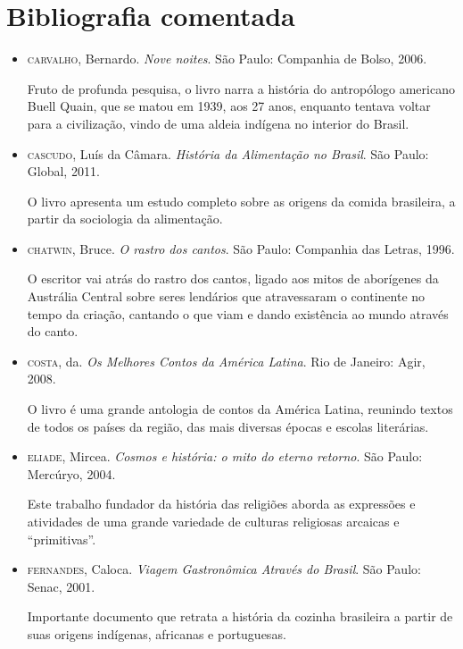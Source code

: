 \documentclass[11pt]{extarticle}
\begin{document}
\section{Bibliografia comentada}

\begin{itemize}

\item \textsc{carvalho}, Bernardo. \textit{Nove noites}. São Paulo: Companhia de Bolso, 2006.

Fruto de profunda pesquisa, o livro narra a história do antropólogo americano Buell Quain, que se matou em 1939, aos 27 anos, enquanto tentava voltar para a civilização, vindo de uma aldeia indígena no interior do Brasil.

\item \textsc{cascudo}, Luís da Câmara. \textit{História da Alimentação no Brasil}. São Paulo: Global, 2011.

O livro apresenta um estudo completo sobre as origens da comida brasileira, a partir da sociologia da alimentação.

\item \textsc{chatwin}, Bruce. \textit{O rastro dos cantos}. São Paulo: Companhia das Letras, 1996.

O escritor vai atrás do rastro dos cantos, ligado aos mitos de aborígenes da Austrália Central sobre seres lendários que atravessaram o continente no tempo da criação, cantando o que viam e dando existência ao mundo através do canto.

\item \textsc{costa}, da. \textit{Os Melhores Contos da América Latina}. Rio de Janeiro: Agir, 2008.

O livro é uma grande antologia de contos da América Latina, reunindo textos de todos os países da região, das mais diversas épocas e escolas literárias.

\item \textsc{eliade}, Mircea. \textit{Cosmos e história: o mito do eterno retorno}. São Paulo: Mercúryo, 2004.

Este trabalho fundador da história das religiões aborda as expressões e atividades de uma grande variedade de culturas religiosas arcaicas e ``primitivas''.

\item \textsc{fernandes}, Caloca. \textit{Viagem Gastronômica Através do Brasil}. São Paulo: Senac, 2001.

Importante documento que retrata a história da cozinha brasileira a partir de suas origens indígenas, africanas e portuguesas.


\end{itemize}
\end{document}
